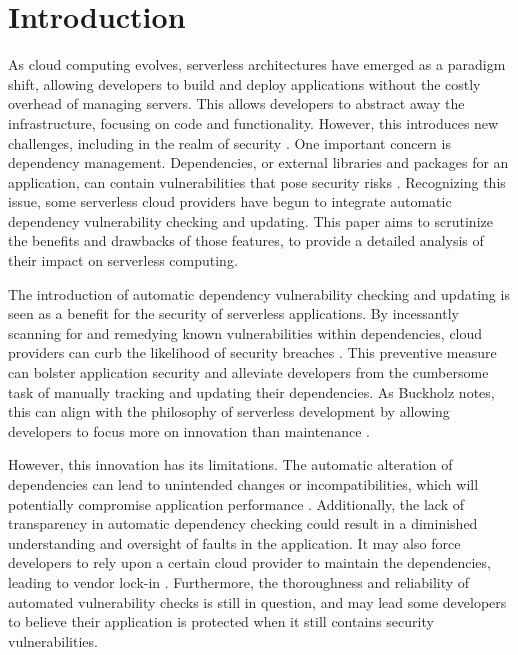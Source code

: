 \documentclass[sigconf]{acmart}
\begin{document}
\maketitle


\section{Introduction}
As cloud computing evolves, serverless architectures have emerged as a paradigm shift, allowing developers to build and deploy applications without the costly overhead of managing servers. This allows developers to abstract away the infrastructure, focusing on code and functionality. However, this introduces new challenges, including in the realm of security \cite{baldini2017serverless}. One important concern is dependency management. Dependencies, or external libraries and packages for an application, can contain vulnerabilities that pose security risks \cite{marin2022serverless}. Recognizing this issue, some serverless cloud providers have begun to integrate automatic dependency vulnerability checking and updating. This paper aims to scrutinize the benefits and drawbacks of those features, to provide a detailed analysis of their impact on serverless computing.

The introduction of automatic dependency vulnerability checking and updating is seen as a benefit for the security of serverless applications. By incessantly scanning for and remedying known vulnerabilities within dependencies, cloud providers can curb the likelihood of security breaches \cite{snyk2023security}. This preventive measure can bolster application security and alleviate developers from the cumbersome task of manually tracking and updating their dependencies. As Buckholz notes, this can align with the philosophy of serverless development by allowing developers to focus more on innovation than maintenance \cite{buckholz2018serverless}.

However, this innovation has its limitations. The automatic alteration of dependencies can lead to unintended changes or incompatibilities, which will potentially compromise application performance \cite{benischke2023updates}. Additionally, the lack of transparency in automatic dependency checking could result in a diminished understanding and oversight of faults in the application. It may also force developers to rely upon a certain cloud provider to maintain the dependencies, leading to vendor lock-in \cite{kavis2014cloud}.
Furthermore, the thoroughness and reliability of automated vulnerability checks is still in question, and may lead some developers to believe their application is protected when it still contains security vulnerabilities.
\end{document}
